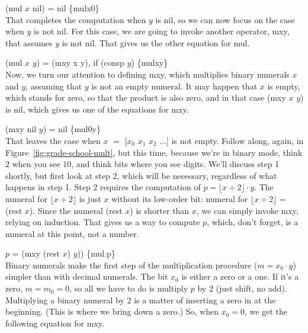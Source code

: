 \hspace*{2cm} (mul $x$ nil) = nil \hspace{2cm} \hfill \{mulx0\}
\\

That completes the computation when $y$ is nil,
so we can now focus on the case when $y$ is not nil.
For this case, we are going to invoke another operator, mxy,
that assumes $y$ is not nil. That gives us the other equation
for mul.

\hspace*{2cm} (mul $x$ $y$) = (mxy x y), if (consp $y$) \hfill \{mulxy\}
\\

Now, we turn our attention to defining mxy, which multiplies binary
numerals $x$ and $y$, assuming that $y$ is not an empty numeral.
It may happen that $x$ is empty, which stands for zero, so that
the product is also zero, and in that case (mxy $x$ $y$) is nil,
which gives us one of the equations for mxy.

\hspace*{2cm} (mxy nil $y$) = nil  \hfill \{mul0y\}
\\

That leaves the case when $x$ $=$ [$x_0$ $x_1$ $x_2$ ...] is not empty.
Follow along, again, in Figure~\ref{fig:grade-school-mult},
but this time, because we're in binary mode, think $2$ when you see $10$,
and think bits where you see digits.
We'll discuss step 1 shortly, but first look at step 2,
which will be necessary, regardless of what happens in step 1.
Step 2 requires the computation of
$p = \lfloor x \div 2 \rfloor \cdot y$.
The numeral for $\lfloor x \div 2 \rfloor$ is just $x$ without its
low-order bit: numeral for $\lfloor x \div 2 \rfloor =$ (rest $x$).
Since the numeral (rest $x$) is shorter than $x$,
we can simply invoke mxy, relying on induction.
That gives us a way to compute $p$, which, don't forget,
is a numeral at this point, not a number.

\hspace*{2cm} $p$ = (mxy (rest $x$) $y$)) \hfill \{mul.p\}
\\

Binary numerals make the first step of the
multiplication procedure ($m = x_0 \cdot y$)
simpler than with decimal numerals.
The bit $x_0$ is either a zero or a one.
If it's a zero, $m = m_0 = 0$, so all
we have to do is multiply $p$ by $2$ (just shift, no add).
Multiplying a binary numeral by $2$ is a matter
of inserting a zero in at the beginning.
(This is where we bring down a zero.)
So, when $x_0 = 0$, we get the following equation for mxy.

